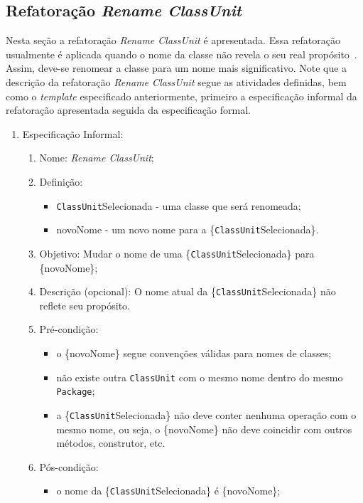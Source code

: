 \subsection{Refatoração \textit{Rename ClassUnit}}
Nesta seção a refatoração \textit{Rename ClassUnit} é apresentada. Essa refatoração usualmente é aplicada quando o nome da classe não revela o seu real propósito~\cite{Fowler1999}. Assim, deve-se renomear a classe para um nome mais significativo. Note que a descrição da refatoração \textit{Rename ClassUnit} segue as atividades definidas, bem como o \textit{template} especificado anteriormente, primeiro a especificação informal da refatoração apresentada seguida da especificação formal.

\begin{enumerate}
	\item Especificação Informal:
		\begin{enumerate}
			\item Nome: \textit{Rename ClassUnit};
			\item Definição:
			    \begin{itemize}
			        \item \texttt{ClassUnit}Selecionada - uma classe que será renomeada;
			        \item novoNome - um novo nome para a \{\texttt{ClassUnit}Selecionada\}.
			    \end{itemize}
			\item Objetivo: Mudar o nome de uma \{\texttt{ClassUnit}Selecionada\} para \{novoNome\};
			\item Descrição (opcional): O nome atual da \{\texttt{ClassUnit}Selecionada\} não reflete seu propósito.
			\item Pré-condição:
			    \begin{itemize}
			        \item o \{novoNome\} segue convenções válidas para nomes de classes;
			        \item não existe outra \texttt{ClassUnit} com o mesmo nome dentro do mesmo \texttt{Package};
			        \item a \{\texttt{ClassUnit}Selecionada\} não deve conter nenhuma operação com o mesmo nome, ou seja, o \{novoNome\} não deve coincidir com outros métodos, construtor, etc. 
			    \end{itemize}
			\item Pós-condição:
			    \begin{itemize}
			        \item o nome da \{\texttt{ClassUnit}Selecionada\} é \{novoNome\};

\end{itemize}
\end{enumerate}
\end{enumerate}
